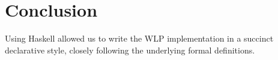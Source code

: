 \documentclass[]{scrartcl}
\begin{document}

\section{Conclusion}

Using Haskell allowed us to write the WLP implementation in a succinct declarative
style, closely following the underlying formal definitions.

\end{document}

